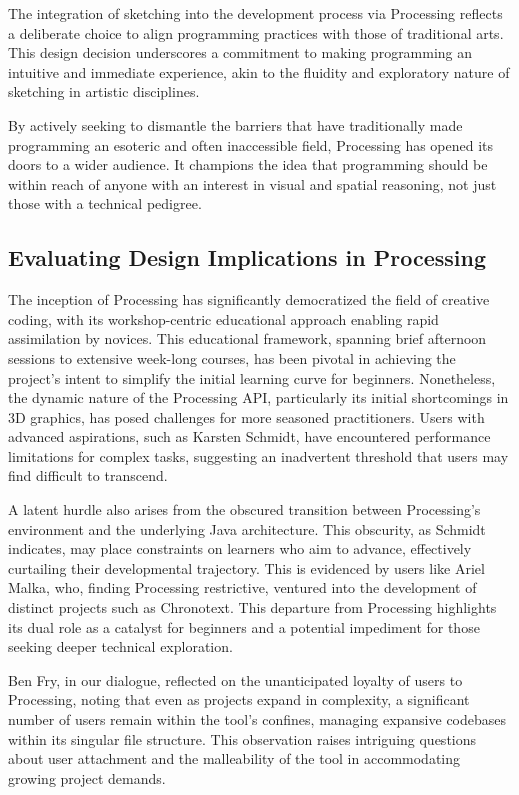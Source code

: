 The integration of sketching into the development process via Processing reflects a deliberate choice to align programming practices with those of traditional arts. This design decision underscores a commitment to making programming an intuitive and immediate experience, akin to the fluidity and exploratory nature of sketching in artistic disciplines.

By actively seeking to dismantle the barriers that have traditionally made programming an esoteric and often inaccessible field, Processing has opened its doors to a wider audience. It champions the idea that programming should be within reach of anyone with an interest in visual and spatial reasoning, not just those with a technical pedigree.

\subsection{Evaluating Design Implications in Processing}

The inception of Processing has significantly democratized the field of creative coding, with its workshop-centric educational approach enabling rapid assimilation by novices. This educational framework, spanning brief afternoon sessions to extensive week-long courses, has been pivotal in achieving the project's intent to simplify the initial learning curve for beginners. Nonetheless, the dynamic nature of the Processing API, particularly its initial shortcomings in 3D graphics, has posed challenges for more seasoned practitioners. Users with advanced aspirations, such as Karsten Schmidt, have encountered performance limitations for complex tasks, suggesting an inadvertent threshold that users may find difficult to transcend.

A latent hurdle also arises from the obscured transition between Processing's environment and the underlying Java architecture. This obscurity, as Schmidt indicates, may place constraints on learners who aim to advance, effectively curtailing their developmental trajectory. This is evidenced by users like Ariel Malka, who, finding Processing restrictive, ventured into the development of distinct projects such as Chronotext. This departure from Processing highlights its dual role as a catalyst for beginners and a potential impediment for those seeking deeper technical exploration.

Ben Fry, in our dialogue, reflected on the unanticipated loyalty of users to Processing, noting that even as projects expand in complexity, a significant number of users remain within the tool's confines, managing expansive codebases within its singular file structure. This observation raises intriguing questions about user attachment and the malleability of the tool in accommodating growing project demands.

